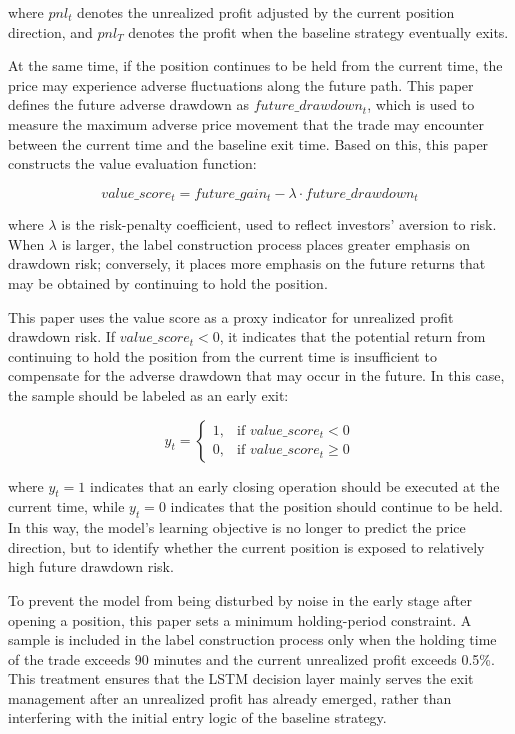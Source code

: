 \documentclass[12pt]{article}
\begin{document}
where $pnl_t$ denotes the unrealized profit adjusted by the current position direction, and 
$pnl_T$ denotes the profit when the baseline strategy eventually exits.

At the same time, if the position continues to be held from the current time, the price may 
experience adverse fluctuations along the future path. This paper defines the future adverse 
drawdown as $future\_drawdown_t$, which is used to measure the maximum adverse price movement 
that the trade may encounter between the current time and the baseline exit time. Based on 
this, this paper constructs the value evaluation function:

\begin{equation}
    value\_score_t = future\_gain_t - \lambda \cdot future\_drawdown_t
\end{equation}

where $\lambda$ is the risk-penalty coefficient, used to reflect investors' aversion to risk. 
When $\lambda$ is larger, the label construction process places greater emphasis on drawdown 
risk; conversely, it places more emphasis on the future returns that may be obtained by 
continuing to hold the position.

This paper uses the value score as a proxy indicator for unrealized profit drawdown risk. If 
$value\_score_t < 0$, it indicates that the potential return from continuing to hold the 
position from the current time is insufficient to compensate for the adverse drawdown that may 
occur in the future. In this case, the sample should be labeled as an early exit:

\begin{equation}
    y_t =
    \begin{cases}
    1, & \text{if } value\_score_t < 0 \\
    0, & \text{if } value\_score_t \geq 0
    \end{cases}
\end{equation}

where $y_t = 1$ indicates that an early closing operation should be executed at the current 
time, while $y_t = 0$ indicates that the position should continue to be held. In this way, the 
model's learning objective is no longer to predict the price direction, but to identify whether 
the current position is exposed to relatively high future drawdown risk.

To prevent the model from being disturbed by noise in the early stage after opening a position, 
this paper sets a minimum holding-period constraint. A sample is included in the label 
construction process only when the holding time of the trade exceeds 90 minutes and the current 
unrealized profit exceeds 0.5\%. This treatment ensures that the LSTM decision layer mainly 
serves the exit management after an unrealized profit has already emerged, rather than 
interfering with the initial entry logic of the baseline strategy.
\end{document}
